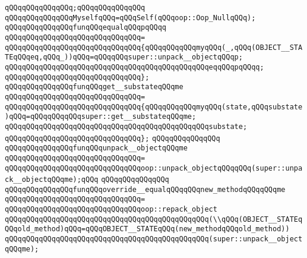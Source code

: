 \verb|qQQqqQQqqQQqqQQq;qQQqqQQqqQQqqQQq|\newline
\newline
\verb|qQQqqQQqqQQqqQQqMyselfqQQq=qQQqSelf(qQQqoop::Oop_NullqQQq);|\newline
\newline
\verb|qQQqqQQqqQQqqQQqfunqQQqequalqQQqpqQQqq|\newline
\verb|qQQqqQQqqQQqqQQqqQQqqQQqqQQqqQQq=|\newline
\verb|qQQqqQQqqQQqqQQqqQQqqQQqqQQqqQQq{qQQqqQQqqQQqmyqQQq(_,qQQq(OBJECT__STATEqQQqeq,qQQq_))qQQq=qQQqqQQqsuper::unpack__objectqQQqp;|\newline
\verb|qQQqqQQqqQQqqQQqqQQqqQQqqQQqqQQqqQQqqQQqqQQqqQQqeqqQQqpqQQqq;|\newline
\verb|qQQqqQQqqQQqqQQqqQQqqQQqqQQqqQQq};|\newline
\newline
\verb|qQQqqQQqqQQqqQQqfunqQQqget__substateqQQqme|\newline
\verb|qQQqqQQqqQQqqQQqqQQqqQQqqQQqqQQq=|\newline
\verb|qQQqqQQqqQQqqQQqqQQqqQQqqQQqqQQq{qQQqqQQqqQQqmyqQQq(state,qQQqsubstate)qQQq=qQQqqQQqqQQqsuper::get__substateqQQqme;|\newline
\verb|qQQqqQQqqQQqqQQqqQQqqQQqqQQqqQQqqQQqqQQqqQQqqQQqsubstate;|\newline
\verb|qQQqqQQqqQQqqQQqqQQqqQQqqQQqqQQq};|\newline
\verb|qQQqqQQqqQQqqQQq|\newline
\verb|qQQqqQQqqQQqqQQqfunqQQqunpack__objectqQQqme|\newline
\verb|qQQqqQQqqQQqqQQqqQQqqQQqqQQqqQQq=|\newline
\verb|qQQqqQQqqQQqqQQqqQQqqQQqqQQqqQQqoop::unpack_objectqQQqqQQq(super::unpack__objectqQQqme);qQQq|\newline
\verb|qQQqqQQqqQQqqQQq|\newline
\verb|qQQqqQQqqQQqqQQqfunqQQqoverride__equalqQQqqQQqnew_methodqQQqqQQqme|\newline
\verb|qQQqqQQqqQQqqQQqqQQqqQQqqQQqqQQq=|\newline
\verb|qQQqqQQqqQQqqQQqqQQqqQQqqQQqqQQqoop::repack_object|\newline
\verb|qQQqqQQqqQQqqQQqqQQqqQQqqQQqqQQqqQQqqQQqqQQqqQQq(\\qQQq(OBJECT__STATEqQQqold_method)qQQq=qQQqOBJECT__STATEqQQq(new_methodqQQqold_method))|\newline
\verb|qQQqqQQqqQQqqQQqqQQqqQQqqQQqqQQqqQQqqQQqqQQqqQQq(super::unpack__objectqQQqme);|\newline
